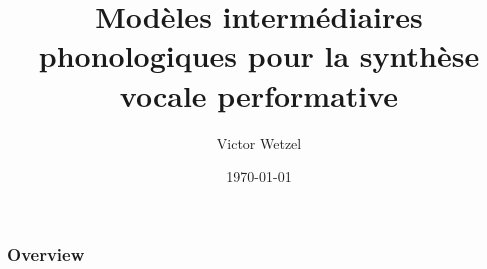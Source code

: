 

\title[]{Modèles intermédiaires phonologiques pour la synthèse vocale
performative} %

\author{Victor Wetzel} %
\date{\today} %



\begin{frame}
\titlepage %
\end{frame}

\begin{frame}
\frametitle{Overview} %
\tableofcontents %
\end{frame}





